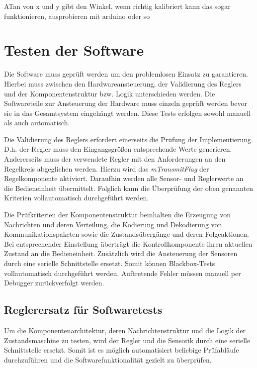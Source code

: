 \documentclass{article}
\begin{document}
ATan von x und y gibt den Winkel, wenn richtig kalibriert kann das sogar funktionieren, ausprobieren mit arduino oder so

\newpage
\section{Testen der Software}
Die Software muss geprüft werden um den problemlosen Einsatz zu garantieren. Hierbei muss zwischen den Hardwareansteuerung, der Validierung des Reglers und der Komponentenstruktur bzw. Logik unterschieden werden.
Die Softwareteile zur Ansteuerung der Hardware muss einzeln geprüft werden bevor sie in das Gesamtsystem eingehängt werden. Diese Tests erfolgen sowohl manuell als auch automatisch.

Die Validierung des Reglers erfordert einerseits die Prüfung der Implementierung. D.h. der Regler muss den Eingangsgrößen entsprechende Werte generieren. Andererseits muss der verwendete Regler mit den Anforderungen an den Regelkreis abgeglichen werden. Hierzu wird das \textit{mTransmitFlag} der Regelkomponente aktiviert. Daraufhin werden alle Sensor- und Reglerwerte an die Bedieneinheit übermittelt. Folglich kann die Überprüfung der oben genannten Kriterien vollautomatisch durchgeführt werden.

Die Prüfkriterien der Komponentenstruktur beinhalten die Erzeugung von Nachrichten und deren Verteilung, die Kodierung und Dekodierung von Kommunikationspaketen sowie die Zustandsübergänge und deren Folgeaktionen. Bei entsprechender Einstellung überträgt die Kontrollkomponente ihren aktuellen Zustand an die Bedieneinheit. Zusätzlich wird die Ansteuerung der Sensoren durch eine serielle Schnittstelle ersetzt. Somit können Blackbox-Tests vollautomatisch durchgeführt werden. Auftretende Fehler müssen manuell per Debugger zurückverfolgt werden.


\subsection*{Reglerersatz für Softwaretests}
Um die Komponentenarchitektur, deren Nachrichtenstruktur und die Logik der Zustandsmaschine zu testen, wird der Regler und die Sensorik durch eine serielle Schnittstelle ersetzt. Somit ist es möglich automatisiert beliebige Prüfabläufe durchzuführen und die Softwarefunktionalität gezielt zu überprüfen.
\end{document}
